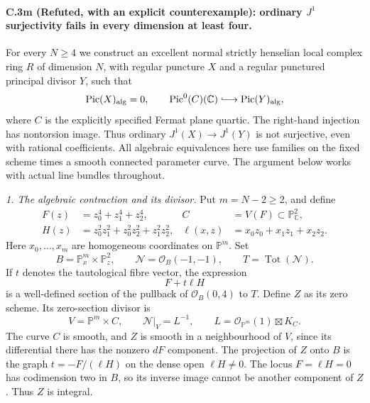 \paragraph{C.3m (Refuted, with an explicit counterexample): ordinary $J^1$ surjectivity fails in every dimension at least four.}
For every $N\ge4$ we construct an excellent normal
strictly henselian local complex ring $R$ of dimension
$N$, with regular puncture $X$ and a regular punctured
principal divisor $Y$, such that
\begin{equation}\label{eq:C3-ordinary-nonsurjection}
 \operatorname{Pic}(X)_{\mathrm{alg}}=0,
 \qquad
 \operatorname{Pic}^0(C)(\mathbb C)
       \lhook\joinrel\longrightarrow
       \operatorname{Pic}(Y)_{\mathrm{alg}},
\end{equation}
where $C$ is the explicitly specified Fermat plane
quartic. The right-hand injection has nontorsion
image. Thus ordinary $J^1(X)\to J^1(Y)$ is not
surjective, even with rational coefficients.
All algebraic equivalences here use families on the
fixed scheme times a smooth connected parameter
curve. The argument below works with actual line
bundles throughout.

\emph{1. The algebraic contraction and its divisor.}
Put $m=N-2\ge2$, and define
\[
\begin{aligned}
 F(z)&=z_0^4+z_1^4+z_2^4, & C&=V(F)\subset\mathbb P^2_{\mathbb C},\\
 H(z)&=z_0^2z_1^2+z_0^2z_2^2+z_1^2z_2^2,&
 \ell(x,z)&=x_0z_0+x_1z_1+x_2z_2.
\end{aligned}
\]
Here $x_0,\ldots,x_m$ are homogeneous coordinates on
$\mathbb P^m$. Set
\[
 B=\mathbb P^m_x\times\mathbb P^2_z,
 \qquad \mathcal N=\mathcal O_B(-1,-1),
 \qquad T=\operatorname{Tot}(\mathcal N).
\]
If $t$ denotes the tautological fibre vector, the
expression
\[
                         F+t\ell H
\]
is a well-defined section of the pullback of
$\mathcal O_B(0,4)$ to $T$. Define $Z$ as its zero
scheme. Its zero-section divisor is
\[
 V=\mathbb P^m\times C,
 \qquad
 \mathcal N|_V=L^{-1},
 \qquad L=\mathcal O_{\mathbb P^m}(1)\boxtimes K_C.
\]
The curve $C$ is smooth, and $Z$ is smooth in a
neighbourhood of $V$, since its differential there
has the nonzero $dF$ component. The projection of
$Z$ onto $B$ is the graph
$t=-F/(\ell H)$ on the dense open $\ell H\ne0$.
The locus $F=\ell H=0$ has codimension two in $B$,
so its inverse image cannot be another component
of $Z$. Thus $Z$ is integral.

